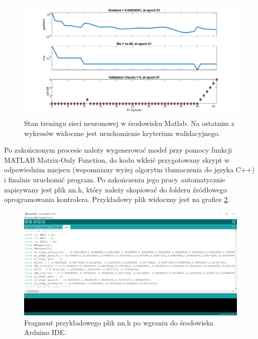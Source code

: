 \documentclass[12pt, a4paper]{article}
\begin{document}
 \begin{figure}[ht]
    \centering
    \includegraphics[width=1\textwidth]{training_state}
    \caption{Stan treningu sieci neuronowej w środowisku Matlab. Na ostatnim z wykresów widoczne jest uruchomienie kryterium walidacyjnego.}
    \label{fig:matwyk}
\end{figure}

Po zakończonym procesie należy wygenerować model przy pomocy funkcji MATLAB Matrix-Only Function, do kodu wkleić przygotowany skrypt w odpowiednim miejscu (wspomniany wyżej algorytm tłumaczenia do języka C++) i finalnie uruchomić program. Po zakończeniu jego pracy automatycznie zapisywany jest plik nn.h, który należy skopiować do folderu źródłowego oprogramowania kontrolera. Przykładowy plik widoczny jest na grafice \ref{fig:nn}.

 \begin{figure}[ht]
    \centering
    \includegraphics[width=1\textwidth]{nnh}
    \caption{Fragment przykładowego plik nn.h po wgraniu do środowiska Arduino IDE.}
    \label{fig:nn}
\end{figure}

\FloatBarrier
\end{document}
